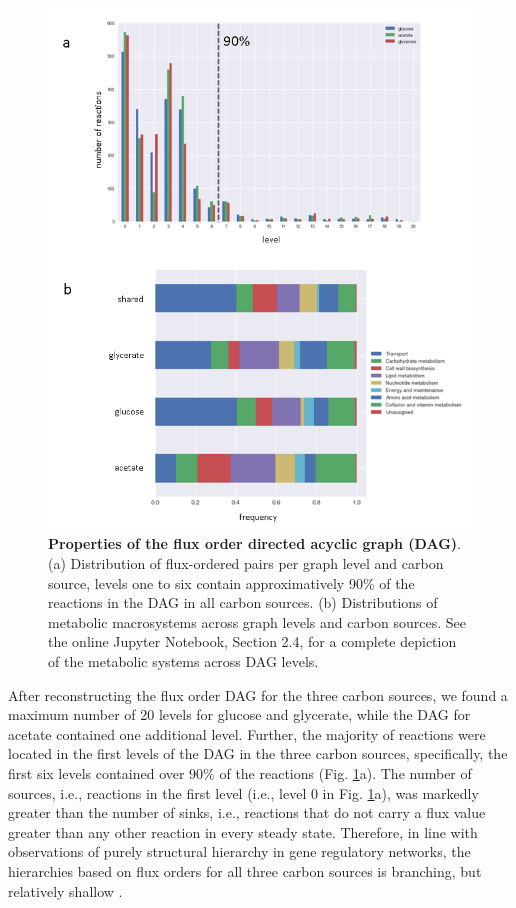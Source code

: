 \documentclass[12pt]{article}
\begin{document}
\begin{figure}
\centering
\includegraphics[scale=1]{Fig2.png}
\caption{\small \textbf{Properties of the flux order directed acyclic graph (DAG)}. (a) Distribution of flux-ordered pairs per graph level and carbon source, levels one to six contain approximatively 90\% of the reactions in the DAG in all carbon sources. (b) Distributions of metabolic macrosystems across graph levels and carbon sources. See the online Jupyter Notebook, Section 2.4, for a complete depiction of the metabolic systems across DAG levels.}
\label{fig:hierarchy}
\end{figure}

After reconstructing the flux order DAG for the three carbon sources, we found a maximum number of 20 levels for glucose and glycerate, while the DAG for acetate contained one additional level. Further, the majority of reactions were located in the first levels of the DAG in the three carbon sources, specifically, the first six levels contained over 90\% of the reactions (Fig. \ref{fig:hierarchy}a). The number of sources, i.e., reactions in the first level (i.e., level 0 in Fig. \ref{fig:hierarchy}a), was markedly greater than the number of sinks, i.e., reactions that do not carry a flux value greater than any other reaction in every steady state. Therefore, in line with observations of purely structural hierarchy in gene regulatory networks, the hierarchies based on flux orders for all three carbon sources is branching, but relatively shallow \cite{Shen-Orr2002}.
\end{document}
